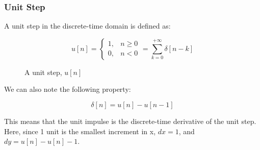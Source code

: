 \documentclass[letterpaper,12pt]{article}
\begin{document}
\subsubsection*{Unit Step}
A unit step in the discrete-time domain is defined as:

\[u[n] =
    \begin{cases}
        1, & n \geq 0 \\
        0, & n < 0
    \end{cases}
    = \sum_{k=0}^{+\infty} \delta[n-k]\]

\begin{figure}[!ht]
    \centering
    
    \caption{A unit step, $u[n]$}\label{fig:unit_step}
\end{figure}

We can also note the following property:

\[\delta [n] = u[n] - u[n-1]\]

This means that the unit impulse is the discrete-time derivative of the unit step. Here, since 1 unit is the smallest increment in x, $dx = 1$, and $dy = u[n] - u[n] - 1$.
\end{document}
